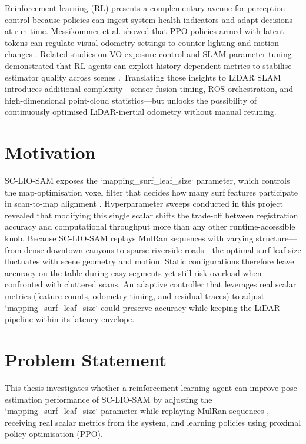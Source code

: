 Reinforcement learning (RL) presents a complementary avenue for perception control because policies can ingest system health indicators and adapt decisions at run time. Messikommer et al. showed that PPO policies armed with latent tokens can regulate visual odometry settings to counter lighting and motion changes \cite{nicomessikommer_2024_reinforcement}. Related studies on VO exposure control and SLAM parameter tuning demonstrated that RL agents can exploit history-dependent metrics to stabilise estimator quality across scenes \cite{ma_2025_mambadqn,zhang_2024_efficient}. Translating those insights to LiDAR SLAM introduces additional complexity—sensor fusion timing, ROS orchestration, and high-dimensional point-cloud statistics—but unlocks the possibility of continuously optimised LiDAR-inertial odometry without manual retuning.

\section{Motivation}
SC-LIO-SAM exposes the `mapping\_surf\_leaf\_size` parameter, which controls the map-optimisation voxel filter that decides how many surf features participate in scan-to-map alignment \cite{shan_2020_liosam}. Hyperparameter sweeps conducted in this project revealed that modifying this single scalar shifts the trade-off between registration accuracy and computational throughput more than any other runtime-accessible knob. Because SC-LIO-SAM replays MulRan sequences \cite{kim_2020_mulran} with varying structure—from dense downtown canyons to sparse riverside roads—the optimal surf leaf size fluctuates with scene geometry and motion. Static configurations therefore leave accuracy on the table during easy segments yet still risk overload when confronted with cluttered scans. An adaptive controller that leverages real scalar metrics (feature counts, odometry timing, and residual traces) to adjust `mapping\_surf\_leaf\_size` could preserve accuracy while keeping the LiDAR pipeline within its latency envelope.

\section{Problem Statement}
This thesis investigates whether a reinforcement learning agent can improve pose-estimation performance of SC-LIO-SAM \cite{shan_2020_liosam} by adjusting the `mapping\_surf\_leaf\_size` parameter while replaying MulRan sequences \cite{kim_2020_mulran}, receiving real scalar metrics from the system, and learning policies using proximal policy optimisation (PPO).

